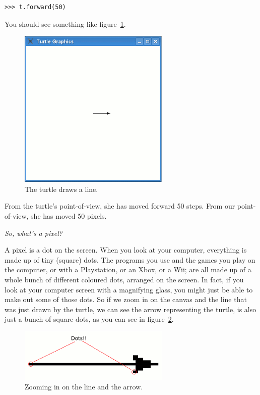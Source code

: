 \begin{listing}
\begin{verbatim}
>>> t.forward(50)
\end{verbatim}
\end{listing}

You should see something like figure~\ref{fig11}.

\begin{figure}
\begin{center}
\includegraphics[width=72mm]{figure11.eps}
\end{center}
\caption{The turtle draws a line.}\label{fig11}
\end{figure}

From the turtle's point-of-view, she has moved forward 50 steps.  From our point-of-view, she has moved 50 pixels.

\noindent
\emph{So, what's a pixel?}

A pixel is a dot on the screen.  When you look at your computer, everything is made up of tiny (square) dots.  The programs you use and the games you play on the computer, or with a Playstation, or an Xbox, or a Wii; are all made up of a whole bunch of different coloured dots, arranged on the screen.  In fact, if you look at your computer screen with a magnifying glass, you might just be able to make out some of those dots. So if we zoom in on the canvas and the line that was just drawn by the turtle, we can see the arrow representing the turtle, is also just a bunch of square dots, as you can see in figure~\ref{fig12}.

\begin{figure}
\begin{center}
\includegraphics[width=72mm]{figure12.eps}
\end{center}
\caption{Zooming in on the line and the arrow.}\label{fig12}
\end{figure}

